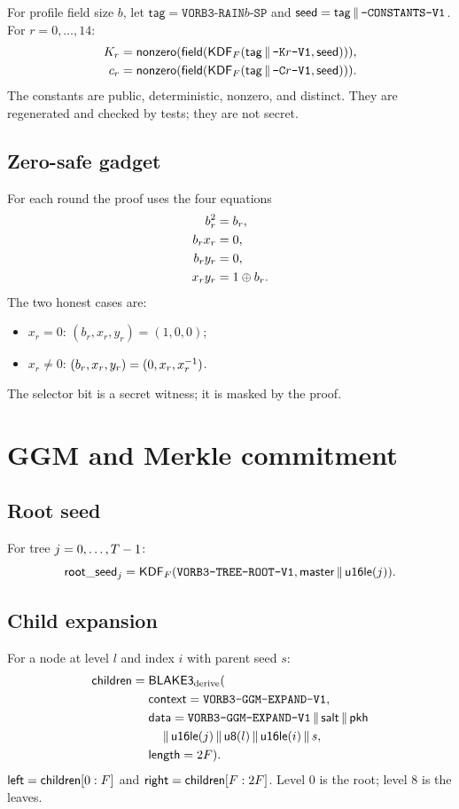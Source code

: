 \documentclass[11pt,a4paper]{article}
\begin{document}
For profile field size $b$, let
$\mathsf{tag}=\texttt{VORB3-RAIN}b\texttt{-SP}$ and
$\mathsf{seed}=\mathsf{tag}\,\|\,\texttt{-CONSTANTS-V1}$.
For $r=0,\ldots,14$:
\begin{align}
K_r&=\mathsf{nonzero}(\mathsf{field}(\mathsf{KDF}_F(
  \mathsf{tag}\,\|\,\texttt{-K}r\texttt{-V1},\mathsf{seed}))),\\
c_r&=\mathsf{nonzero}(\mathsf{field}(\mathsf{KDF}_F(
  \mathsf{tag}\,\|\,\texttt{-C}r\texttt{-V1},\mathsf{seed}))).
\end{align}
The constants are public, deterministic, nonzero, and distinct. They are
regenerated and checked by tests; they are not secret.

\subsection{Zero-safe gadget}

For each round the proof uses the four equations
\begin{align}
b_r^2&=b_r,\\
b_r x_r&=0,\\
b_r y_r&=0,\\
x_r y_r&=1\oplus b_r.
\end{align}
The two honest cases are:
\begin{itemize}
  \item $x_r=0$: $(b_r,x_r,y_r)=(1,0,0)$;
  \item $x_r\ne0$: $(b_r,x_r,y_r)=(0,x_r,x_r^{-1})$.
\end{itemize}
The selector bit is a secret witness; it is masked by the proof.

\section{GGM and Merkle commitment}

\subsection{Root seed}

For tree $j=0,\ldots,T-1$:
\[
\mathsf{root\_seed}_j=
\mathsf{KDF}_F(\texttt{VORB3-TREE-ROOT-V1},
\mathsf{master}\,\|\,\mathsf{u16le}(j)).
\]

\subsection{Child expansion}

For a node at level $l$ and index $i$ with parent seed $s$:
\begin{align*}
\mathsf{children}={}&
\mathsf{BLAKE3}_{\mathrm{derive}}(\\
&\mathsf{context}=\texttt{VORB3-GGM-EXPAND-V1},\\
&\mathsf{data}=\texttt{VORB3-GGM-EXPAND-V1}\,\|\,\mathsf{salt}\,\|\,\mathsf{pkh}\\
&\quad\,\|\,\mathsf{u16le}(j)\,\|\,\mathsf{u8}(l)\,\|\,\mathsf{u16le}(i)\,\|\, s,\\
&\mathsf{length}=2F).
\end{align*}
$\mathsf{left}=\mathsf{children}[0:F]$ and
$\mathsf{right}=\mathsf{children}[F:2F]$. Level 0 is the root;
level 8 is the leaves.
\end{document}
